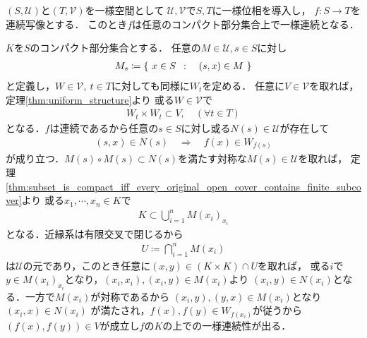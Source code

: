 	\begin{prf}
		
	\end{prf}
	
	\begin{screen}
		\begin{thm}[連続写像はコンパクト集合上で一様連続]
			$(S,\mathscr{U})$と$(T,\mathscr{V})$を一様空間として
			$\mathscr{U},\mathscr{V}$で$S,T$に一様位相を導入し，
			$f:S \longrightarrow T$を連続写像とする．
			このとき$f$は任意のコンパクト部分集合上で一様連続となる．
		\end{thm}
	\end{screen}
	
	\begin{prf}
		$K$を$S$のコンパクト部分集合とする．
		任意の$M \in \mathscr{U}, s \in S$に対し
		\begin{align}
			M_s \coloneqq \left\{\ x \in S\ \, : \quad (s,x) \in M\ \right\}
		\end{align}
		と定義し，$W \in \mathscr{V},\ t \in T$に対しても同様に$W_t$を定める．
		任意に$V \in \mathscr{V}$を取れば，定理\ref{thm:uniform_structure}より
		或る$W \in \mathscr{V}$で
		\begin{align}
			W_t \times W_t \subset V,
			\quad (\forall t \in T)
		\end{align}
		となる．$f$は連続であるから任意の$s \in S$に対し或る$N(s) \in \mathscr{U}$が存在して
		\begin{align}
			(s,x) \in N(s) \quad \Longrightarrow \quad
			f(x) \in W_{f(s)}
		\end{align}
		が成り立つ．$M(s) \circ M(s) \subset N(s)$を満たす対称な$M(s) \in \mathscr{U}$を取れば，
		定理\ref{thm:subset_is_compact_iff_every_original_open_cover_contains_finite_subcover}より
		或る$x_1,\cdots,x_n \in K$で
		\begin{align}
			K \subset \bigcup_{i=1}^n M(x_i)_{x_i}
		\end{align}
		となる．近縁系は有限交叉で閉じるから
		\begin{align}
			U \coloneqq \bigcap_{i=1}^n M(x_i)
		\end{align}
		は$\mathscr{U}$の元であり，このとき任意に$(x,y) \in (K \times K) \cap U$を取れば，
		或る$i$で$y \in M(x_i)_{x_i}$となり，$(x_i,x_i),(x_i,y) \in M(x_i)$より
		$(x_i,y) \in N(x_i)$となる．一方で$M(x_i)$が対称であるから
		$(x_i,y),(y,x) \in M(x_i)$となり$(x_i,x) \in N(x_i)$
		が満たされ，$f(x),f(y) \in W_{f(x_i)}$が従うから
		$(f(x),f(y)) \in V$が成立し$f$の$K$の上での一様連続性が出る．
		\QED
	\end{prf}
	
